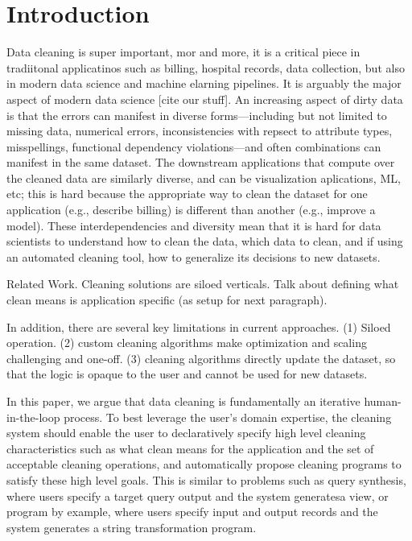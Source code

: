 \section{Introduction}\label{intro}\sloppy

Data cleaning is super important, mor and more, it is a critical piece in tradiitonal applicatinos such as billing, hospital records, data collection, but also in modern data science and machine elarning pipelines.  It is arguably the major aspect of modern data science [cite our stuff].
An increasing aspect of dirty data is that the errors can manifest in diverse forms---including but not limited to missing data, numerical errors, inconsistencies with repsect to attribute types, misspellings, functional dependency violations---and often combinations can manifest in the same dataset.
The downstream applications that compute over the cleaned data are similarly diverse, and can be visualization aplications, ML, etc; this is hard because the appropriate way to clean the dataset for one application (e.g., describe billing) is different than another (e.g., improve a model).
These interdependencies and diversity mean that it is hard for data scientists to understand how to clean the data, which data to clean, and if using an automated cleaning tool, how to generalize its decisions to new datasets.

Related Work.  Cleaning solutions are siloed verticals.   Talk about defining what clean means is application specific (as setup for next paragraph).

In addition, there are several key limitations in current approaches.  (1) Siloed operation.   (2) custom cleaning algorithms make optimization and scaling challenging and one-off.  (3) cleaning algorithms directly update the dataset, so that the logic is opaque to the user and cannot be used for new datasets.  

In this paper, we argue that data cleaning is fundamentally an iterative human-in-the-loop process.
To best leverage the user's domain expertise, the cleaning system should enable the user to declaratively specify high level cleaning characteristics
such as what clean means for the application and the set of acceptable cleaning operations, and automatically propose cleaning programs to satisfy these high level goals.
This is similar to problems such as query synthesis, where users specify a target query output and the system generatesa  view, or program by example, where users specify input and output records and the system generates a string transformation program.

